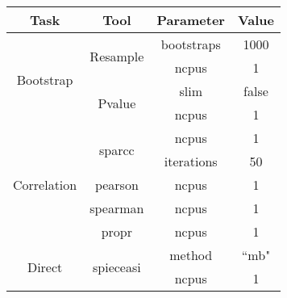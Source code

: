 \begin{table}[H]
\centering
\small
\begin{tabular}{|c|c|c|c|}
\hline
\textbf{Task}                & \textbf{Tool}                                                                           & \textbf{Parameter}     & \textbf{Value} \\ \hline
\multirow{4}{*}{Bootstrap}   & \multirow{2}{*}{Resample}                                                               & bootstraps             & 1000           \\
                             &                                                                                         & ncpus                  & 1              \\ \cline{2-4}
                             & \multirow{2}{*}{Pvalue}                                                                 & slim                   & false          \\
                             &                                                                                         & ncpus                  & 1              \\ \hline
\multirow{5}{*}{Correlation} & \multirow{2}{*}{sparcc}                                                                 & ncpus                  & 1              \\
                             &                                                                                         & iterations             & 50             \\ \cline{2-4}
                             & pearson                                                                                 & ncpus                  & 1              \\ \cline{2-4}
                             & spearman                                                                                & ncpus                  & 1              \\ \cline{2-4}
                             & propr                                                                                   & ncpus                  & 1              \\ \hline
\multirow{17}{*}{Direct}     & \multirow{5}{*}{spieceasi}                                                              & method                 & ``mb"           \\
                             &                                                                                         & ncpus                  & 1              \\

\end{tabular}
\end{table}
